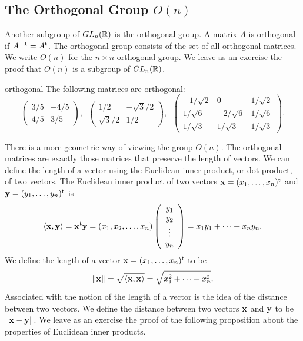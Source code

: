  
 
\subsection*{The Orthogonal Group $O(n)$}
 
 
 
Another subgroup of $GL_n({\Bbb R})$ is the orthogonal group. A matrix
$A$ is {\bfi
orthogonal\/} if
$A^{-1} = A^{\rm t}$. The {\bfi orthogonal
group\/} consists of
the set of all orthogonal matrices. We write
$O(n)$\label{noteorthogonal} for the $n \times n$ orthogonal group. We
leave as an exercise the proof that $O(n)$ is a subgroup of $GL_n(
{\Bbb R})$.
 
 
\begin{example}{orthogonal}
The following matrices are orthogonal:
\[
\left(
\begin{array}{cc}
3/5 & -4/5 \\
4/5 & 3/5
\end{array}
\right), \; \;
\left(
\begin{array}{cc}
1/2 & -\sqrt{3}/2 \\
\sqrt{3}/2 & 1/2
\end{array}
\right), \; \;
\left(
\begin{array}{ccc}
-1/\sqrt{2} & 0 & 1/ \sqrt{2} \\
1/\sqrt{6} & -2/\sqrt{6} & 1/\sqrt{6} \\
1/ \sqrt{3} & 1/ \sqrt{3} & 1/ \sqrt{3} 
\end{array}
\right).
\]
\end{example}

 
There is a more geometric way of viewing the group $O(n)$. The
orthogonal matrices are exactly those matrices that preserve the
length of vectors. We can define the length of a vector using the
{\bfi Euclidean inner product}, or
{\bfi dot product}, of two vectors. The Euclidean inner product of
two vectors ${\bold x}=(x_1, \ldots, x_n)^{\rm t}$ and ${\bold
y}=(y_1, \ldots, y_n)^{\rm t}$ is
\[
\langle  {\bold x}, {\bold y} \rangle
=
{\bold x}^{\rm t}  {\bold y}
=
(x_1, x_2, \ldots, x_n)
\left(
\begin{array}{c}
y_1 \\
y_2 \\
\vdots \\
y_n
\end{array}
\right)
=
x_1 y_1 + \cdots + x_n y_n.
\]
We define the length of a vector ${\bold x}=(x_1, \ldots, x_n)^{\rm
t}$ to be 
\[
\| {\bold x} \|\label{notelengthvect} 
= \sqrt{\langle  {\bold x}, {\bold x} \rangle} 
= \sqrt{x_1^2 + \cdots + x_n^2}.
\]
Associated with the notion of the length of a vector is the idea of
the distance between two vectors. We define the {\bfi distance\/}
between two vectors ${\bold x}$ and ${\bold y}$ to be $\| {\bold
x}-{\bold y} \|$. We leave as an exercise the proof of the following
proposition about the properties of Euclidean inner products.  
 
